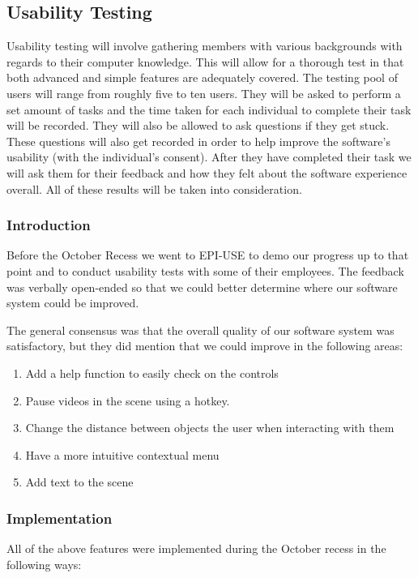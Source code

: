 \documentclass{article}
\begin{document}
	\subsection{Usability Testing}

	Usability testing will involve gathering members with various backgrounds with regards to their computer knowledge. This will allow for a thorough test in that both
	advanced and simple features are adequately covered. The testing pool of users will range from roughly five to ten users. They will be asked to perform a set amount of
	tasks and the time taken for each individual to complete their task will be recorded. They will also be allowed to ask questions if they get stuck. These questions will
	also get recorded in order to help improve the software's usability (with the individual's consent). After they have completed their task we will ask them for their
	feedback and how they felt about the software experience overall. All of these results will be taken into consideration.
	
	\subsubsection{Introduction}
	
	Before the October Recess we went to EPI-USE to demo our progress up to that point and to conduct usability tests with some of their employees. The feedback was verbally open-ended so that we could better determine where our software system could be improved.
	
	The general consensus was that the overall quality of our software system was satisfactory, but they did mention that we could improve in the following areas:
	\begin{enumerate}
		\item Add a help function to easily check on the controls
		\item Pause videos in the scene using a hotkey.
		\item Change the distance between objects the user when interacting with them
		\item Have a more intuitive contextual menu
		\item Add text to the scene
	\end{enumerate}
	
	\subsubsection{Implementation}
	All of the above features were implemented during the October recess in the following ways:
	
\end{document}
